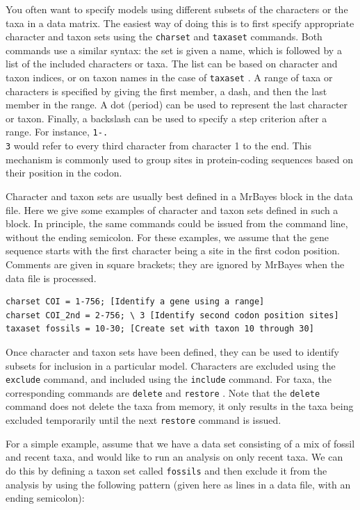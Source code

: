 \documentclass[12pt]{book}
\newcommand{\ttt}[1]{\texttt{#1} }
\begin{document}
You often want to specify models using different subsets of the characters or the taxa in a data
matrix. The easiest way of doing this is to first specify appropriate character and taxon sets
using the \ttt{charset} and \ttt{taxaset} commands. Both commands use a similar syntax: the set is
given a name, which is followed by a list of the included characters or taxa. The list can be based
on character and taxon indices, or on taxon names in the case of \ttt{taxaset}. A range of taxa or
characters is specified by giving the first member, a dash, and then the last member in the range.
A dot (period) can be used to represent the last character or taxon.  Finally, a backslash can be
used to specify a step criterion after a range. For instance, \ttt{1-.\\3} would refer to every
third character from character 1 to the end. This mechanism is commonly used to group sites in
protein-coding sequences based on their position in the codon.

Character and taxon sets are usually best defined in a MrBayes block in the data file. Here we give
some examples of character and taxon sets defined in such a block. In principle, the same commands
could be issued from the command line, without the ending semicolon. For these examples, we assume
that the gene sequence starts with the first character being a site in the first codon position.
Comments are given in square brackets; they are ignored by MrBayes when the data file is processed.

\footnotesize
\begin{singlespacing}
\begin{verbatim}
charset COI = 1-756; [Identify a gene using a range]
charset COI_2nd = 2-756; \ 3 [Identify second codon position sites]
taxaset fossils = 10-30; [Create set with taxon 10 through 30] 
\end{verbatim}
\end{singlespacing}
\normalsize

Once character and taxon sets have been defined, they can be used to identify subsets for inclusion
in a particular model. Characters are excluded using the \ttt{exclude} command, and included using
the \ttt{include} command. For taxa, the corresponding commands are \ttt{delete} and \ttt{restore}.
Note that the \ttt{delete} command does not delete the taxa from memory, it only results in the
taxa being excluded temporarily until the next \ttt{restore} command is issued.

For a simple example, assume that we have a data set consisting of a mix of fossil and recent taxa,
and would like to run an analysis on only recent taxa. We can do this by defining a taxon set
called \ttt{fossils} and then exclude it from the analysis by using the following pattern (given
here as lines in a data file, with an ending semicolon):
\end{document}
